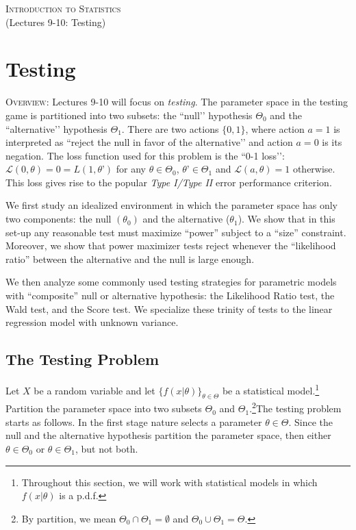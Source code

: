 \documentclass[11pt]{article} %
\begin{document}
\onehalfspace

\vspace*{\fill}
\begingroup
\centering

\Large {\scshape Introduction to Statistics}\\

(Lectures 9-10: Testing)

\endgroup
\vspace*{\fill}

\newpage


\section{Testing}

{\scshape Overview:} \noindent Lectures 9-10 will focus on \emph{testing}. The parameter space in the testing game is partitioned into two subsets: the ``null’’ hypothesis $\Theta_0$ and the ``alternative’’ hypothesis $\Theta_1$. There are two actions $\{0,1\}$, where action $a=1$ is interpreted as ``reject the null in favor of the alternative’’  and action $a=0$ is its negation. The loss function used for this problem is the ``0-1 loss’’: $\mathcal{L}(0,\theta) = 0 =  L(1,\theta’)$ for any $\theta \in \Theta_0$, $\theta’ \in \Theta_1$ and $\mathcal{L}(a,\theta)=1$ otherwise. This loss gives rise to the popular \emph{Type I/Type II} error performance criterion. 

We first study an idealized environment in which the parameter space has only two components: the null $(\theta_0)$ and the alternative ($\theta_1$). We show that in this set-up any reasonable test must maximize “power” subject to a “size” constraint. Moreover, we show that power maximizer tests reject whenever the “likelihood ratio” between the alternative and the null is large enough. 


We then analyze some commonly used testing strategies for parametric models with “composite” null or alternative hypothesis: the Likelihood Ratio test, the Wald test, and the Score test. We specialize these trinity of tests to the linear regression model with unknown variance.  



\subsection{The Testing Problem} 

Let $X$ be a random variable and let $\{f(x | \theta)\}_{\theta \in \Theta}$ be a statistical model.\footnote{Throughout this section, we will work with statistical models in which $f(x | \theta)$ is a p.d.f.} Partition the parameter space into two subsets $\Theta_0$ and $\Theta_1$.\footnote{By partition, we mean $\Theta_0 \cap \Theta_1 = \emptyset$ and $\Theta_0 \cup \Theta_1 = \Theta$.}The testing problem starts as follows. In the first stage nature selects a parameter $\theta \in \Theta$. Since the null and the alternative hypothesis partition the parameter space, then either $\theta \in \Theta_0$ or $\theta \in \Theta_1$, but not both. 
\end{document}
